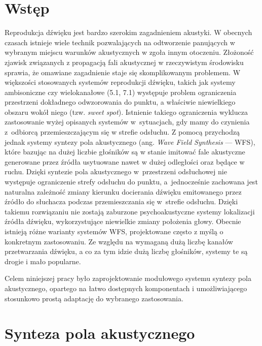 \documentclass[12pt]{oska}
\affiliation{Akademia Górniczo-Hutnicza im. Stanisława Staszica w Krakowie}
\let\Oldsection\section
\renewcommand{\section}{\FloatBarrier\Oldsection}
\begin{document}
\maketitles

\section{Wstęp}

Reprodukcja dźwięku jest bardzo szerokim zagadnieniem akustyki. W obecnych
czasach istnieje wiele technik pozwalających na odtworzenie panujących w
wybranym miejscu warunków akustycznych w zgoła innym otoczeniu. Złożoność
zjawisk związanych z propagacją fali akustycznej w rzeczywistym środowisku
sprawia, że omawiane zagadnienie staje się skomplikowanym problemem.  W większości
stosowanych systemów reprodukcji dźwięku, takich jak systemy ambisoniczne czy
wielokanałowe (5.1, 7.1) występuje problem ograniczenia przestrzeni dokładnego
odwzorowania do punktu, a właściwie niewielkiego obszaru wokół niego (tzw.
\textit{sweet spot}).
Istnienie takiego ograniczenia wyklucza zastosowanie wyżej opisanych systemów w~sytuacjach, gdy mamy do czynienia z~odbiorcą przemieszczającym się w strefie
odsłuchu. Z pomocą przychodzą jednak systemy syntezy pola akustycznego (ang.
\textit{Wave Field Synthesis} --- WFS), które bazując na dużej liczbie
głośników są w stanie imitować fale akustyczne generowane przez źródła
usytuowane nawet w dużej odległości oraz będące w ruchu. Dzięki syntezie pola
akustycznego w~przestrzeni odsłuchowej nie występuje ograniczenie strefy
odsłuchu do punktu, a~jednocześnie zachowana jest naturalna zależność zmiany
kierunku docierania dźwięku emitowanego przez źródło do słuchacza podczas
przemieszczania się w~strefie odsłuchu. Dzięki takiemu rozwiązaniu nie zostają
zaburzone psychoakustyczne systemy lokalizacji źródła dźwięku, wykorzystujące
niewielkie zmiany położenia głowy. Obecnie istnieją różne warianty systemów
WFS, projektowane często z myślą o konkretnym zastosowaniu. Ze względu na
wymaganą dużą liczbę kanałów przetwarzania dźwięku, a co za tym idzie dużą
liczbę głośników, systemy te są drogie i mało popularne. 

Celem niniejszej pracy było zaprojektowanie modułowego systemu syntezy pola
akustycznego, opartego na łatwo dostępnych komponentach i umożliwiającego
stosunkowo prostą adaptację do wybranego zastosowania.

\section{Synteza pola akustycznego}
\end{document}
